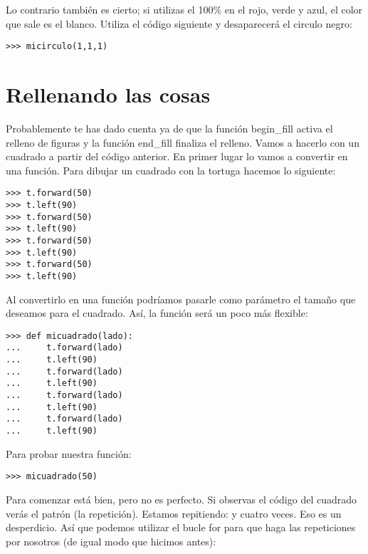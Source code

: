 Lo contrario también es cierto; si utilizas el 100\% en el rojo, verde y azul, el color que sale es el blanco.  Utiliza el código siguiente y desaparecerá el circulo negro:

\begin{listing}
\begin{verbatim}
>>> micirculo(1,1,1)
\end{verbatim}
\end{listing}

\section{Rellenando las cosas}

Probablemente te has dado cuenta ya de que la función begin\_fill activa el relleno de figuras y la función end\_fill finaliza el relleno.  Vamos a hacerlo con un cuadrado a partir del código anterior. En primer lugar lo vamos a convertir en una función. Para dibujar un cuadrado con la tortuga hacemos lo siguiente:

\begin{listing}
\begin{verbatim}
>>> t.forward(50)
>>> t.left(90)
>>> t.forward(50)
>>> t.left(90)
>>> t.forward(50)
>>> t.left(90)
>>> t.forward(50)
>>> t.left(90)
\end{verbatim}
\end{listing}

Al convertirlo en una función podríamos pasarle como parámetro el tamaño que deseamos para el cuadrado. Así, la función será un poco más flexible:

\begin{listing}
\begin{verbatim}
>>> def micuadrado(lado):
...     t.forward(lado)
...     t.left(90)
...     t.forward(lado)
...     t.left(90)
...     t.forward(lado)
...     t.left(90)
...     t.forward(lado)
...     t.left(90)
\end{verbatim}
\end{listing}

\noindent
Para probar nuestra función:

\begin{listing}
\begin{verbatim}
>>> micuadrado(50)
\end{verbatim}
\end{listing}

Para comenzar está bien, pero no es perfecto.  Si observas el código del cuadrado verás el patrón (la repetición). Estamos repitiendo:  y  cuatro veces.  Eso es un desperdicio.  Así que podemos utilizar el bucle for para que haga las repeticiones por nosotros (de igual modo que hicimos antes):

